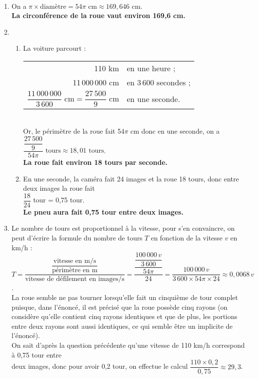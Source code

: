 \ \\ [-5mm]
\begin{enumerate}
   \item On a $\pi\times\text{diamètre} =54\pi\text{ cm} \approx169,646\text{ cm}$. \\
   {\bf La circonférence de la roue vaut environ 169,6 cm.}
   \item
   \begin{enumerate}
      \item La voiture parcourt : \begin{tabular}[t]{rl}
         110 km & en une heure ; \\
         11\,000\,000 cm & en 3\,600 secondes ; \\ [1mm]
         $\dfrac{11\,000\,000}{3\,600}\text{ cm} =\dfrac{27\,500}{9}\text{ cm}$ & en une seconde. \\
      \end{tabular} \\ [1mm]
      Or, le périmètre de la roue fait 54$\pi$ cm donc en une seconde, on a $\dfrac{\dfrac{27\,500}{9}}{54\pi}\text{ tours} \approx18,01\text{ tours}$. \\
      {\bf La roue fait environ 18 tours par seconde.}
      \item En une seconde, la caméra fait 24 images et la roue 18 tours, donc entre deux images la roue fait \\
      $\dfrac{18}{24}$ tour = 0,75 tour. \\ [1mm]
      {\bf Le pneu aura fait 0,75 tour entre deux images.}
   \end{enumerate}
   \item Le nombre de tours est proportionnel à la vitesse, pour s'en convaincre, on peut d'écrire la formule du nombre de tours $T$ en fonction de la vitesse $v$ en km/h : \\ [1mm]
   $T =\dfrac{\dfrac{\text{vitesse en m/s}}{\text{périmètre en m}}}{\text{vitesse de défilement en images/s}} =\dfrac{\dfrac{\dfrac{100\,000\,v}{3\,600}}{54\pi}}{24} =\dfrac{100\,000\,v}{3\,600\times54\pi\times24} \approx 0,0068\,v$. \\ [2mm]
    La roue semble ne pas tourner lorsqu'elle fait un cinquième de tour complet puisque, dans l'énoncé, il est précisé que la roue possède cinq rayons (on considère qu'elle contient cinq rayons identiques et que de plus, les portions entre deux rayons sont aussi identiques, ce qui semble être un implicite de l'énoncé). \\
   On sait d'après la question précédente qu'une vitesse de 110 km/h correspond à 0,75 tour entre \\ [1mm] deux images, donc pour avoir 0,2 tour, on effectue le calcul $\dfrac{110\times0,2}{0,75} \approx29,3$. \\

\end{enumerate}
